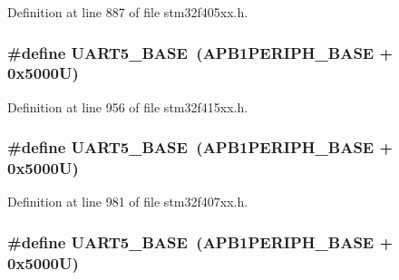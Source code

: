 Definition at line 887 of file stm32f405xx.\+h.

\subsubsection[{\texorpdfstring{U\+A\+R\+T5\+\_\+\+B\+A\+SE}{UART5_BASE}}]{\setlength{\rightskip}{0pt plus 5cm}\#define U\+A\+R\+T5\+\_\+\+B\+A\+SE~({\bf A\+P\+B1\+P\+E\+R\+I\+P\+H\+\_\+\+B\+A\+SE} + 0x5000\+U)}\hypertarget{group___peripheral__registers__structures_gaa155689c0e206e6994951dc3cf31052a}{}\label{group___peripheral__registers__structures_gaa155689c0e206e6994951dc3cf31052a}


Definition at line 956 of file stm32f415xx.\+h.

\subsubsection[{\texorpdfstring{U\+A\+R\+T5\+\_\+\+B\+A\+SE}{UART5_BASE}}]{\setlength{\rightskip}{0pt plus 5cm}\#define U\+A\+R\+T5\+\_\+\+B\+A\+SE~({\bf A\+P\+B1\+P\+E\+R\+I\+P\+H\+\_\+\+B\+A\+SE} + 0x5000\+U)}\hypertarget{group___peripheral__registers__structures_gaa155689c0e206e6994951dc3cf31052a}{}\label{group___peripheral__registers__structures_gaa155689c0e206e6994951dc3cf31052a}


Definition at line 981 of file stm32f407xx.\+h.

\subsubsection[{\texorpdfstring{U\+A\+R\+T5\+\_\+\+B\+A\+SE}{UART5_BASE}}]{\setlength{\rightskip}{0pt plus 5cm}\#define U\+A\+R\+T5\+\_\+\+B\+A\+SE~({\bf A\+P\+B1\+P\+E\+R\+I\+P\+H\+\_\+\+B\+A\+SE} + 0x5000\+U)}\hypertarget{group___peripheral__registers__structures_gaa155689c0e206e6994951dc3cf31052a}{}\label{group___peripheral__registers__structures_gaa155689c0e206e6994951dc3cf31052a}


